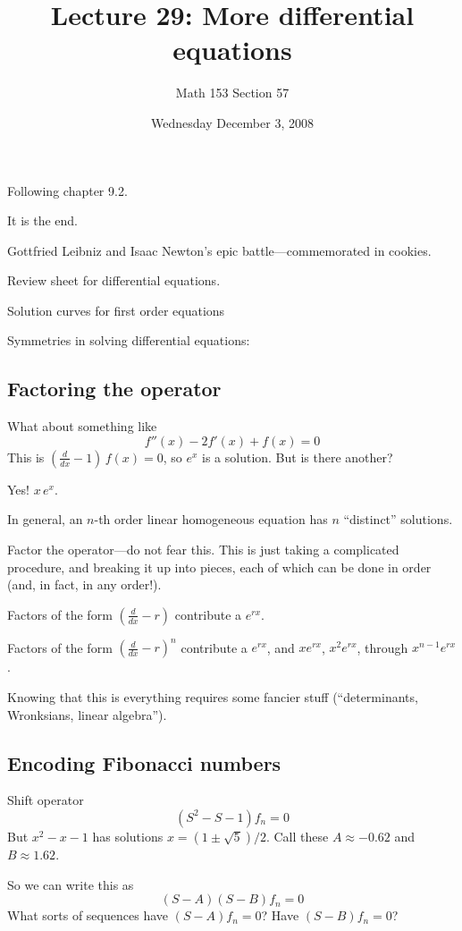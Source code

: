 \documentclass[12pt]{article}
\title{Lecture 29: More differential equations}
\author{Math 153 Section 57}
\date{Wednesday December  3, 2008}
\begin{document}
\maketitle

Following chapter 9.2.

It is the end.

Gottfried Leibniz and Isaac Newton's epic battle---commemorated in cookies.

Review sheet for differential equations.


Solution curves for first order equations

Symmetries in solving differential equations:

\subsection*{Factoring the operator}

What about something like
$$
f''(x) - 2 f'(x) + f(x) = 0
$$
This is $(\frac{d}{dx} - 1) \, f(x) = 0$, so $e^x$ is a solution.  But
is there another?

Yes!  $x \, e^x$.

In general, an $n$-th order linear homogeneous equation has $n$
``distinct'' solutions.

Factor the operator---do not fear this.  This is just taking a
complicated procedure, and breaking it up into pieces, each of which
can be done in order (and, in fact, in any order!).

Factors of the form $( \frac{d}{dx} - r )$ contribute a $e^{rx}$.

Factors of the form $( \frac{d}{dx} - r )^n$ contribute a $e^{rx}$, and $x e^{rx}$, $x^2 e^{rx}$, through $x^{n-1} e^{rx}$.

Knowing that this is everything requires some fancier stuff
(``determinants, Wronksians, linear algebra'').

\subsection*{Encoding Fibonacci numbers}

Shift operator
$$
(S^2 - S - 1) f_n = 0
$$
But $x^2 - x - 1$ has solutions $x = (1 \pm \sqrt{5})/2$.  Call
these $A \approx -0.62$ and $B \approx 1.62$.

So we can write this as
$$
(S - A)(S - B) f_n = 0
$$
What sorts of sequences have $(S - A) f_n = 0$?  Have $(S-B) f_n = 0$?  
\end{document}
